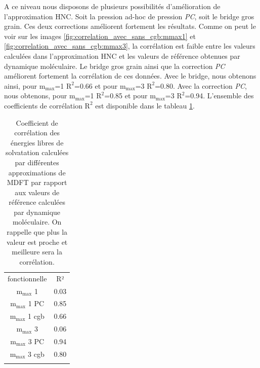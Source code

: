 A ce niveau nous disposons de plusieurs possibilités d'amélioration de l'approximation HNC. Soit la pression ad-hoc de pression \textit{PC}, soit le bridge gros grain. Ces deux corrections améliorent fortement les résultats. Comme on peut le voir sur les images \ref{fig:correlation_avec_sans_cgb:mmax1} et \ref{fig:correlation_avec_sans_cgb:mmax3}, la corrélation est faible entre les valeurs calculées dans l'approximation HNC et les valeurs de référence obtenues par dynamique moléculaire. 
Le bridge gros grain ainsi que la correction \textit{PC} améliorent fortement la corrélation de ces données. Avec le bridge, nous obtenons ainsi, pour $\mathrm{m}_\mathrm{max}$=1 $\mathrm{R}^2$=0.66 et pour $\mathrm{m}_\mathrm{max}$=3 $\mathrm{R}^2$=0.80. Avec la correction \textit{PC}, nous obtenons, pour $\mathrm{m}_\mathrm{max}$=1 $\mathrm{R}^2$=0.85 et pour $\mathrm{m}_\mathrm{max}$=3 $\mathrm{R}^2$=0.94. L'ensemble des coefficients de corrélation $\mathrm{R}^2$ est disponible dans le tableau \ref{tab:correlation}.



\begin{table}[H]
  \begin{center}
    \begin{tabular}{c c}
      \hline & \\[-1em]\hline
       fonctionnelle  & R²  \\
      \hline
       $\mathrm{m}_\mathrm{max}$ 1      & 0.03  \\
       $\mathrm{m}_\mathrm{max}$ 1 PC   & 0.85  \\
       $\mathrm{m}_\mathrm{max}$ 1 cgb  & 0.66  \\
       $\mathrm{m}_\mathrm{max}$ 3      & 0.06  \\
       $\mathrm{m}_\mathrm{max}$ 3 PC   & 0.94  \\
       $\mathrm{m}_\mathrm{max}$ 3 cgb  & 0.80  \\
      \hline & \\[-1em]\hline%
    \end{tabular}
  \end{center}
  \caption[Coefficient de corrélation des énergies libres de solvatation calculées par MDFT par rapport aux valeurs calculées par DM.]{Coefficient de corrélation des énergies libres de solvatation calculées par différentes approximations de MDFT par rapport aux valeurs de référence calculées par dynamique moléculaire. On rappelle que plus la valeur est proche et meilleure sera la corrélation.}
  \label{tab:correlation}  
\end{table}



